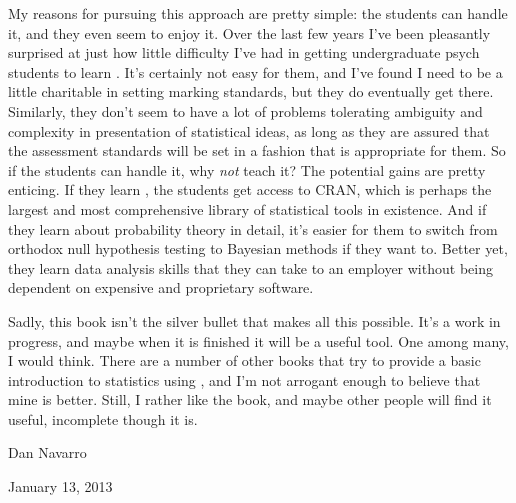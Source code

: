 My reasons for pursuing this approach are pretty simple: the students can handle it, and they even seem to enjoy it. Over the last few years I've been pleasantly surprised at just how little difficulty I've had in getting undergraduate psych students to learn \R. It's certainly not easy for them, and I've found I need to be a little charitable in setting marking standards, but they do eventually get there. Similarly, they don't seem to have a lot of problems tolerating ambiguity and complexity in presentation of statistical ideas, 
as long as they are assured that the assessment standards will be set in a fashion that is appropriate for them.  So if the students can handle it, why {\it not} teach it? The potential gains are pretty enticing. If they learn \R, the students get access to CRAN, which is perhaps the largest and most comprehensive library of statistical tools in existence. And if they learn about probability theory in detail, it's easier for them to switch from orthodox null hypothesis testing to Bayesian methods if they want to. Better yet, they learn data analysis skills that they can take to an employer without being dependent on expensive and proprietary software. \vsp

Sadly, this book isn't the silver bullet that makes all this possible. It's a work in progress, and maybe when it is finished it will be a useful tool. One among many, I would think. There are a number of other books that try to provide a basic introduction to statistics using \R, and I'm not arrogant enough to believe that mine is better. Still, I rather like the book, and maybe other people will find it useful, incomplete though it is.

\vspace*{24pt}
\noindent
Dan Navarro 

\noindent
January 13, 2013
\clearpage 











